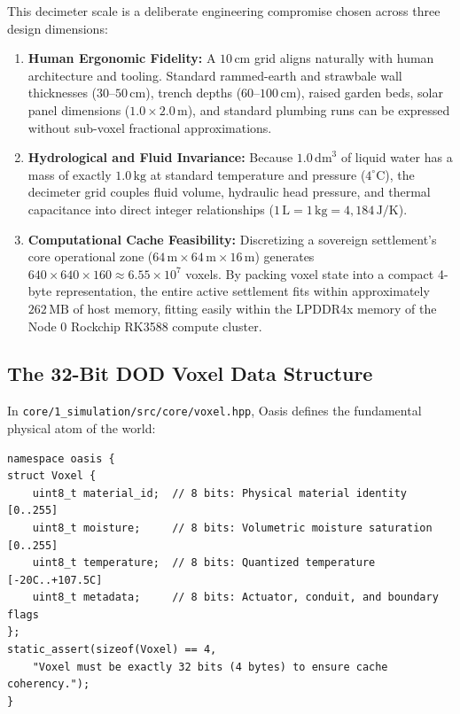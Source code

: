 This decimeter scale is a deliberate engineering compromise chosen across three design dimensions:
\begin{enumerate}
    \item \textbf{Human Ergonomic Fidelity:} A $10\,\mathrm{cm}$ grid aligns naturally with human architecture and tooling. Standard rammed-earth and strawbale wall thicknesses ($30$--$50\,\mathrm{cm}$), trench depths ($60$--$100\,\mathrm{cm}$), raised garden beds, solar panel dimensions ($1.0 \times 2.0\,\mathrm{m}$), and standard plumbing runs can be expressed without sub-voxel fractional approximations.
    \item \textbf{Hydrological and Fluid Invariance:} Because $1.0\,\mathrm{dm}^3$ of liquid water has a mass of exactly $1.0\,\mathrm{kg}$ at standard temperature and pressure ($4^\circ\mathrm{C}$), the decimeter grid couples fluid volume, hydraulic head pressure, and thermal capacitance into direct integer relationships ($1\,\mathrm{L} = 1\,\mathrm{kg} = 4,184\,\mathrm{J/K}$).
    \item \textbf{Computational Cache Feasibility:} Discretizing a sovereign settlement's core operational zone ($64\,\mathrm{m} \times 64\,\mathrm{m} \times 16\,\mathrm{m}$) generates $640 \times 640 \times 160 \approx 6.55 \times 10^7$ voxels. By packing voxel state into a compact 4-byte representation, the entire active settlement fits within approximately $262\,\mathrm{MB}$ of host memory, fitting easily within the LPDDR4x memory of the Node 0 Rockchip RK3588 compute cluster.
\end{enumerate}

\subsection{The 32-Bit DOD Voxel Data Structure}

In \texttt{core/1\_simulation/src/core/voxel.hpp}, Oasis defines the fundamental physical atom of the world:
\begin{verbatim}
namespace oasis {
struct Voxel {
    uint8_t material_id;  // 8 bits: Physical material identity [0..255]
    uint8_t moisture;     // 8 bits: Volumetric moisture saturation [0..255]
    uint8_t temperature;  // 8 bits: Quantized temperature [-20C..+107.5C]
    uint8_t metadata;     // 8 bits: Actuator, conduit, and boundary flags
};
static_assert(sizeof(Voxel) == 4, 
    "Voxel must be exactly 32 bits (4 bytes) to ensure cache coherency.");
}
\end{verbatim}

